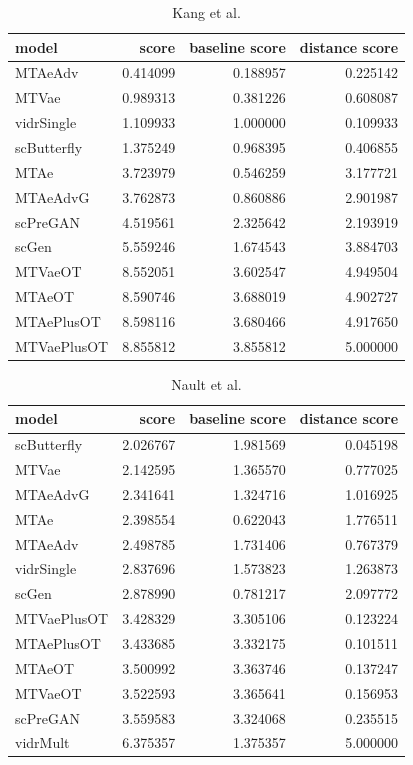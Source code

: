 \documentclass[12pt, a4paper]{article}
\begin{document}
\begin{table}
    \centering
    \begin{tabular}{lrrr}
    \toprule
    model & score & baseline score & distance score \\
    \midrule
    MTAeAdv & 0.414099 & 0.188957 & 0.225142 \\
    MTVae & 0.989313 & 0.381226 & 0.608087 \\
    vidrSingle & 1.109933 & 1.000000 & 0.109933 \\
    scButterfly & 1.375249 & 0.968395 & 0.406855 \\
    MTAe & 3.723979 & 0.546259 & 3.177721 \\
    MTAeAdvG & 3.762873 & 0.860886 & 2.901987 \\
    scPreGAN & 4.519561 & 2.325642 & 2.193919 \\
    scGen & 5.559246 & 1.674543 & 3.884703 \\
    MTVaeOT & 8.552051 & 3.602547 & 4.949504 \\
    MTAeOT & 8.590746 & 3.688019 & 4.902727 \\
    MTAePlusOT & 8.598116 & 3.680466 & 4.917650 \\
    MTVaePlusOT & 8.855812 & 3.855812 & 5.000000 \\
    \bottomrule
    \end{tabular}
    \caption{Kang et al. \cite{kanaGenerativeModelingSinglecell2023}}
\end{table}
    
    
\begin{table}
    \centering
    \begin{tabular}{lrrr}
    \toprule
    model & score & baseline score & distance score \\
    \midrule
    scButterfly & 2.026767 & 1.981569 & 0.045198 \\
    MTVae & 2.142595 & 1.365570 & 0.777025 \\
    MTAeAdvG & 2.341641 & 1.324716 & 1.016925 \\
    MTAe & 2.398554 & 0.622043 & 1.776511 \\
    MTAeAdv & 2.498785 & 1.731406 & 0.767379 \\
    vidrSingle & 2.837696 & 1.573823 & 1.263873 \\
    scGen & 2.878990 & 0.781217 & 2.097772 \\
    MTVaePlusOT & 3.428329 & 3.305106 & 0.123224 \\
    MTAePlusOT & 3.433685 & 3.332175 & 0.101511 \\
    MTAeOT & 3.500992 & 3.363746 & 0.137247 \\
    MTVaeOT & 3.522593 & 3.365641 & 0.156953 \\
    scPreGAN & 3.559583 & 3.324068 & 0.235515 \\
    vidrMult & 6.375357 & 1.375357 & 5.000000 \\
    \bottomrule
    \end{tabular}
    \caption{Nault et al. \cite{nault2021single,nault2022benchmarking}}
\end{table}
\end{document}
